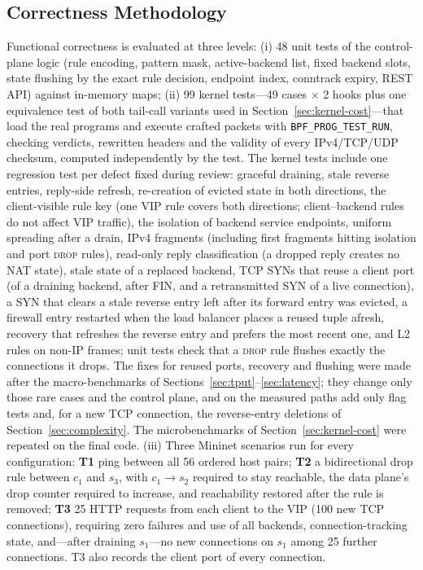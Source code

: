 \documentclass[conference]{IEEEtran}
\begin{document}
\subsection{Correctness Methodology}
Functional correctness is evaluated at three levels: (i) 48 unit tests of the
control-plane logic (rule encoding, pattern mask, active-backend list, fixed
backend slots, state flushing by the exact rule decision, endpoint index, conntrack expiry, REST API)
against in-memory maps; (ii) 99 kernel tests---49 cases $\times$ 2 hooks plus
one equivalence test of both tail-call variants used in
Section~\ref{sec:kernel-cost}---that load the real
programs and execute crafted packets with \texttt{BPF\_PROG\_TEST\_RUN},
checking verdicts, rewritten headers and the validity of every
IPv4/TCP/UDP checksum, computed independently by the test. The kernel tests
include one regression test per defect fixed during review: graceful
draining, stale reverse entries, reply-side refresh, re-creation of evicted
state in both directions, the client-visible rule key (one VIP rule covers
both directions; client--backend rules do not affect VIP traffic), the
isolation of backend service endpoints, uniform spreading after a drain,
IPv4 fragments (including first fragments hitting isolation and port
\textsc{drop} rules), read-only reply classification (a dropped reply creates
no NAT state), stale state of a replaced backend, TCP SYNs that reuse a client
port (of a draining backend, after FIN, and a retransmitted SYN of a live
connection), a SYN that clears a stale reverse entry left after its forward
entry was evicted, a firewall entry restarted when the load balancer places a
reused tuple afresh, recovery that refreshes the reverse entry and prefers
the most recent one, and L2 rules on non-IP frames; unit tests check that a
\textsc{drop} rule flushes exactly the connections it drops. The fixes for
reused ports, recovery and flushing were made after the macro-benchmarks of
Sections~\ref{sec:tput}--\ref{sec:latency}; they change only those rare
cases and the control plane, and on the measured paths add only flag tests
and, for a new TCP connection, the reverse-entry deletions of
Section~\ref{sec:complexity}. The microbenchmarks of
Section~\ref{sec:kernel-cost} were repeated on the final code. (iii) Three Mininet
scenarios run for every configuration: \textbf{T1} ping between all 56
ordered host pairs; \textbf{T2} a bidirectional drop rule between $c_1$ and
$s_3$, with $c_1 \to s_2$ required to stay reachable, the data plane's drop
counter required to increase, and reachability restored after the rule is
removed; \textbf{T3} 25 HTTP requests from each client to the VIP (100 new
TCP connections), requiring zero failures and use of all backends,
connection-tracking state, and---after draining $s_1$---no new connections on
$s_1$ among 25 further connections. T3 also records the client port of
every connection.
\end{document}
